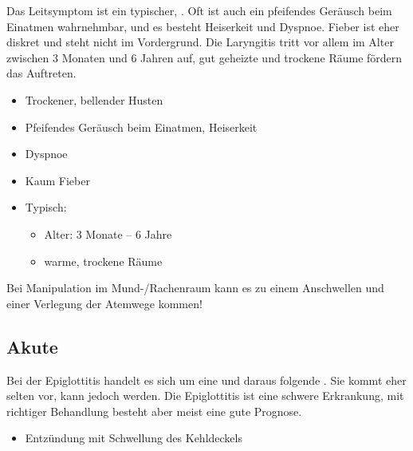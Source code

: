 \TextSlide{\TxSymptome}
{%
Das Leitsymptom ist ein typischer, . Oft ist auch ein pfeifendes Geräusch beim Einatmen
 wahrnehmbar, und es besteht Heiserkeit und Dyspnoe. Fieber ist eher
diskret und steht nicht im Vordergrund. Die Laryngitis tritt
vor allem im Alter zwischen 3 Monaten und 6 Jahren auf, gut geheizte und trockene Räume fördern das Auftreten.


}{
\begin{itemize}
    \item Trockener, bellender Husten
    \item Pfeifendes Geräusch beim Einatmen, Heiserkeit
    \item Dyspnoe
    \item Kaum Fieber
    \item Typisch:
    \begin{itemize}
      \item Alter: 3 Monate -- 6 Jahre
      \item warme, trockene Räume
    \end{itemize}
\end{itemize}
}{}{}{}

\begin{Danger}
  \item Bei Manipulation im Mund-/Rachenraum kann es zu einem Anschwellen und einer Verlegung der Atemwege kommen!
\end{Danger}



\subsection{Akute }
\label{topic:epiglottitis}

\Text{\TxBeschreibung}
{%
Bei der Epiglottitis handelt es sich um eine  und daraus folgende . Sie kommt eher selten vor, kann jedoch
 werden. Die Epiglottitis ist eine schwere
Erkrankung, mit richtiger  Behandlung besteht aber meist
eine gute Prognose.
}{%
\begin{itemize}
  \item Entzündung mit Schwellung des Kehldeckels
\end{itemize}
}{}{}{}



